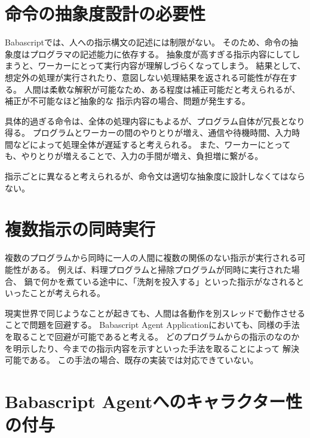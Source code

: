 \section{命令の抽象度設計の必要性}\label{ux547dux4ee4ux306eux62bdux8c61ux5ea6ux8a2dux8a08ux306eux5fc5ux8981ux6027}

Babascriptでは、人への指示構文の記述には制限がない。
そのため、命令の抽象度はプログラマの記述能力に依存する。
抽象度が高すぎる指示内容にしてしまうと、ワーカーにとって実行内容が理解しづらくなってしまう。
結果として、想定外の処理が実行されたり、意図しない処理結果を返される可能性が存在する。
人間は柔軟な解釈が可能なため、ある程度は補正可能だと考えられるが、補正が不可能なほど抽象的な
指示内容の場合、問題が発生する。

具体的過ぎる命令は、全体の処理内容にもよるが、プログラム自体が冗長となり得る。
プログラムとワーカーの間のやりとりが増え、通信や待機時間、入力時間などによって処理全体が遅延すると考えられる。
また、ワーカーにとっても、やりとりが増えることで、入力の手間が増え、負担増に繋がる。

指示ごとに異なると考えられるが、命令文は適切な抽象度に設計しなくてはならない。

\section{複数指示の同時実行}\label{ux8907ux6570ux6307ux793aux306eux540cux6642ux5b9fux884c}

複数のプログラムから同時に一人の人間に複数の関係のない指示が実行される可能性がある。
例えば、料理プログラムと掃除プログラムが同時に実行された場合、
鍋で何かを煮ている途中に、「洗剤を投入する」といった指示がなされるといったことが考えられる。

現実世界で同じようなことが起きても、人間は各動作を別スレッドで動作させることで問題を回避する。
Babascript Agent
Applicationにおいても、同様の手法を取ることで回避が可能であると考える。
どのプログラムからの指示のなのかを明示したり、今までの指示内容を示すといった手法を取ることによって
解決可能である。 この手法の場合、既存の実装では対応できていない。

\section{Babascript
Agentへのキャラクター性の付与}\label{babascript-agentux3078ux306eux30adux30e3ux30e9ux30afux30bfux30fcux6027ux306eux4ed8ux4e0e}

